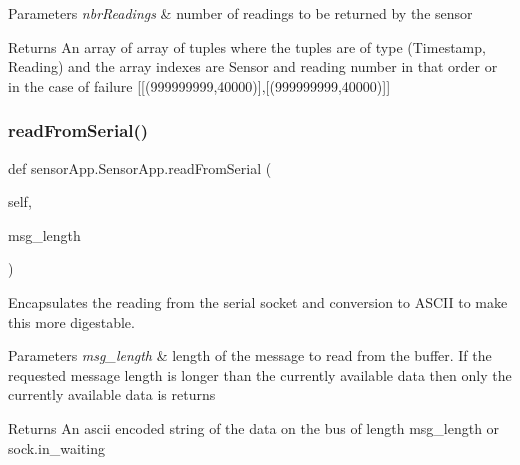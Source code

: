 \begin{DoxyParams}{Parameters}
{\em nbr\+Readings} & number of readings to be returned by the sensor\\
\hline
\end{DoxyParams}
\begin{DoxyReturn}{Returns}
An array of array of tuples where the tuples are of type (Timestamp, Reading) and the array indexes are Sensor and reading number in that order or in the case of failure \mbox{[}\mbox{[}(999999999,40000)\mbox{]},\mbox{[}(999999999,40000)\mbox{]}\mbox{]} 
\end{DoxyReturn}
\mbox{\label{classsensor_app_1_1_sensor_app_a23ea17545530a32aaf5c4b949b20dc9f}} 
\subsubsection{\texorpdfstring{read\+From\+Serial()}{readFromSerial()}}
{\footnotesize\ttfamily def sensor\+App.\+Sensor\+App.\+read\+From\+Serial (\begin{DoxyParamCaption}\item[{}]{self,  }\item[{}]{msg\+\_\+length }\end{DoxyParamCaption})}



Encapsulates the reading from the serial socket and conversion to A\+S\+C\+II to make this more digestable. 


\begin{DoxyParams}{Parameters}
{\em msg\+\_\+length} & length of the message to read from the buffer. If the requested message length is longer than the currently available data then only the currently available data is returns\\
\hline
\end{DoxyParams}
\begin{DoxyReturn}{Returns}
An ascii encoded string of the data on the bus of length msg\+\_\+length or sock.\+in\+\_\+waiting 
\end{DoxyReturn}
\mbox{\label{classsensor_app_1_1_sensor_app_aca850979049ee038baa71e599b4a2d12}} 
